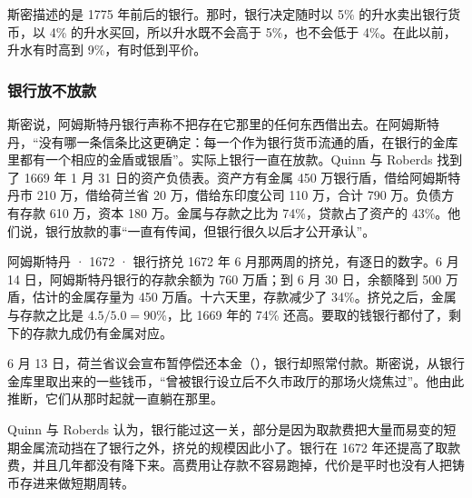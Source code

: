 斯密描述的是 1775 年前后的银行。那时，银行决定随时以 5\% 的升水卖出银行货币，以 4\% 的升水买回，所以升水既不会高于 5\%，也不会低于 4\%。在此以前，升水有时高到 9\%，有时低到平价\cite{smith1776}。


\subsubsection{银行放不放款}
斯密说，阿姆斯特丹银行声称不把存在它那里的任何东西借出去。在阿姆斯特丹，“没有哪一条信条比这更确定：每一个作为银行货币流通的盾，在银行的金库里都有一个相应的金盾或银盾”\cite{smith1776}。实际上银行一直在放款。Quinn 与 Roberds 找到了 1669 年 1 月 31 日的资产负债表。资产方有金属 450 万银行盾，借给阿姆斯特丹市 210 万，借给荷兰省 20 万，借给东印度公司 110 万，合计 790 万。负债方有存款 610 万，资本 180 万。金属与存款之比为 74\%\cite{qr2010}，贷款占了资产的 43\%。他们说，银行放款的事“一直有传闻，但银行很久以后才公开承认”\cite{qr2010}。

\begin{case}{阿姆斯特丹 · 1672 · 银行挤兑}
1672 年 6 月那两周的挤兑，有逐日的数字。6 月 14 日，阿姆斯特丹银行的存款余额为 760 万盾；到 6 月 30 日，余额降到 500 万盾，估计的金属存量为 450 万盾\cite{qr2010}。十六天里，存款减少了 34\%。挤兑之后，金属与存款之比是 $4.5/5.0=90\%$，比 1669 年的 74\% 还高。要取的钱银行都付了，剩下的存款九成仍有金属对应。

6 月 13 日，荷兰省议会宣布暂停偿还本金（），银行却照常付款\cite{qr2010,gj2011}。斯密说，从银行金库里取出来的一些钱币，“曾被银行设立后不久市政厅的那场火烧焦过”。他由此推断，它们从那时起就一直躺在那里\cite{smith1776}。

Quinn 与 Roberds 认为，银行能过这一关，部分是因为取款费把大量而易变的短期金属流动挡在了银行之外，挤兑的规模因此小了。银行在 1672 年还提高了取款费，并且几年都没有降下来\cite{qr2010}。高费用让存款不容易跑掉，代价是平时也没有人把铸币存进来做短期周转。
\end{case}

